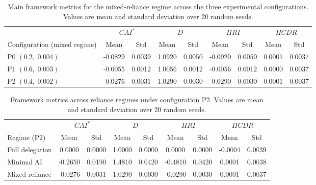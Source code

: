 \documentclass[11pt,a4paper]{article}
\begin{document}
\begin{table}[htbp]
\centering
\small
\setlength{\tabcolsep}{4pt}
\begin{tabular}{
@{}
l
S[table-format=-1.4]
S[table-format=1.4]
S[table-format=1.4]
S[table-format=1.4]
S[table-format=-1.4]
S[table-format=1.4]
S[table-format=-1.4]
S[table-format=1.4]
@{}
}
\toprule
& 
& 
& 
&  \\
\cmidrule(lr){2-3}
\cmidrule(lr){4-5}
\cmidrule(lr){6-7}
\cmidrule(lr){8-9}
Configuration (mixed regime) & {Mean} & {Std} & {Mean} & {Std} & {Mean} & {Std} & {Mean} & {Std} \\
\midrule
P0 $(0.2,\;0.004)$ & -0.0829 & 0.0039 & 1.0920 & 0.0050 & -0.0920 & 0.0050 & 0.0001 & 0.0037 \\
P1 $(0.6,\;0.003)$ & -0.0055 & 0.0012 & 1.0056 & 0.0012 & -0.0056 & 0.0012 & 0.0000 & 0.0037 \\
P2 $(0.4,\;0.002)$ & -0.0276 & 0.0031 & 1.0290 & 0.0030 & -0.0290 & 0.0030 & 0.0001 & 0.0037 \\
\bottomrule
\end{tabular}
\caption{Main framework metrics for the mixed-reliance regime across the three experimental configurations. Values are mean and standard deviation over 20 random seeds.}
\label{tab:mixed-configs}
\end{table}

\begin{table}[htbp]
\centering
\small
\setlength{\tabcolsep}{4pt}
\begin{tabular}{
@{}
l
S[table-format=-1.4]
S[table-format=1.4]
S[table-format=-1.4]
S[table-format=1.4]
S[table-format=-1.4]
S[table-format=1.4]
S[table-format=-1.4]
S[table-format=1.4]
@{}
}
\toprule
& 
& 
& 
&  \\
\cmidrule(lr){2-3}
\cmidrule(lr){4-5}
\cmidrule(lr){6-7}
\cmidrule(lr){8-9}
Regime (P2) & {Mean} & {Std} & {Mean} & {Std} & {Mean} & {Std} & {Mean} & {Std} \\
\midrule
Full delegation & 0.0000 & 0.0000 & 1.0000 & 0.0000 & 0.0000 & 0.0000 & -0.0004 & 0.0039 \\
Minimal AI      & -0.2650 & 0.0190 & 1.4810 & 0.0420 & -0.4810 & 0.0420 & 0.0001 & 0.0038 \\
Mixed reliance  & -0.0276 & 0.0031 & 1.0290 & 0.0030 & -0.0290 & 0.0030 & 0.0001 & 0.0037 \\
\bottomrule
\end{tabular}
\caption{Framework metrics across reliance regimes under configuration P2. Values are mean and standard deviation over 20 random seeds.}
\label{tab:p2-regimes}
\end{table}
\end{document}
